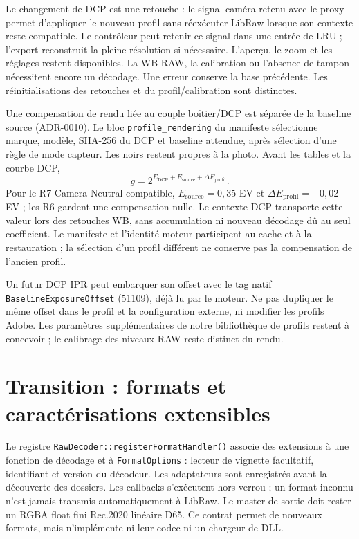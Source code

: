 Le changement de DCP est une retouche : le signal caméra retenu avec le proxy
permet d'appliquer le nouveau profil sans réexécuter LibRaw lorsque son contexte
reste compatible. Le contrôleur peut retenir ce signal dans une entrée de LRU ;
l'export reconstruit la pleine résolution si nécessaire.
L'aperçu, le zoom et les réglages restent disponibles.
La WB RAW, la calibration ou l'absence de tampon nécessitent encore un
décodage. Une erreur conserve la base précédente. Les réinitialisations des
retouches et du profil/calibration sont distinctes.

Une compensation de rendu liée au couple boîtier/DCP est séparée de la baseline
source (ADR-0010). Le bloc \texttt{profile\_rendering} du manifeste sélectionne
marque, modèle, SHA-256 du DCP et baseline attendue, après sélection d'une règle
de mode capteur. Les noirs restent propres à la photo. Avant les tables et la courbe DCP,
\[
g=2^{E_{\mathrm{DCP}}+E_{\mathrm{source}}+\Delta E_{\mathrm{profil}}}.
\]
Pour le R7 Camera Neutral compatible, $E_{\mathrm{source}}=0{,}35$ EV et
$\Delta E_{\mathrm{profil}}=-0{,}02$ EV ; les R6 gardent une compensation nulle.
Le contexte DCP transporte cette valeur lors des retouches WB, sans accumulation
ni nouveau décodage dû au seul coefficient. Le manifeste et l'identité moteur
participent au cache et à la restauration ; la sélection d'un profil différent
ne conserve pas la compensation de l'ancien profil.

Un futur DCP IPR peut embarquer son offset avec le tag natif
\texttt{BaselineExposureOffset} (51109), déjà lu par le moteur. Ne pas dupliquer
le même offset dans le profil et la configuration externe, ni modifier les
profils Adobe. Les paramètres supplémentaires de notre bibliothèque de profils
restent à concevoir ; le calibrage des niveaux RAW reste distinct du rendu.

\section{Transition : formats et caractérisations extensibles}

Le registre \texttt{RawDecoder::registerFormatHandler()} associe des extensions
à une fonction de décodage et à \texttt{FormatOptions} : lecteur de vignette
facultatif, identifiant et version du décodeur. Les adaptateurs sont enregistrés
avant la découverte des dossiers. Les callbacks s'exécutent hors verrou ;
un format inconnu n'est jamais transmis automatiquement à LibRaw. Le master
de sortie doit rester un RGBA float fini Rec.2020 linéaire D65. Ce contrat
permet de nouveaux formats, mais n'implémente ni leur codec ni un chargeur de DLL.

